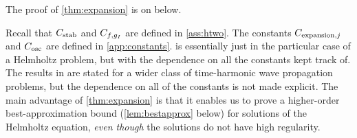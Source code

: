 \enth

The proof of \cref{thm:expansion} is on  below.

Recall that $C_{\mathrm{stab}}$ and $C_{f,g_{I}}$ are defined in \cref{ass:htwo}. The constants $C_{\mathrm{expansion},j}$ and $C_{\mathrm{osc}}$ are defined in \cref{app:constants}.  is essentially just \cite[Theorem 1]{ChNi:19} in the particular case of a Helmholtz problem, but with the dependence on all the constants kept track of. The results in \cite{ChNi:19} are stated for a wider class of time-harmonic wave propagation problems, but the dependence on all of the constants is not made explicit.  The main advantage of \cref{thm:expansion} is that it enables us to prove a higher-order best-approximation bound (\cref{lem:bestapprox} below) for solutions of the Helmholtz equation, \emph{even though} the solutions do not have high regularity.

